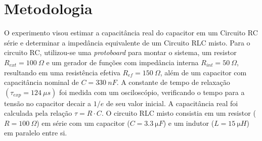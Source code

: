 \section{Metodologia}

O experimento visou estimar a capacitância real do capacitor em um Circuito RC série e determinar a impedância equivalente de um Circuito RLC misto. Para o circuito RC, utilizou-se uma \textit{protoboard} para montar o sistema, um resistor $R_{ext}=100~\Omega$ e um gerador de funções com impedância interna $R_{int}=50~\Omega$, resultando em uma resistência efetiva $R_{ef}=150~\Omega$, além de um capacitor com capacitância nominal de \(C = \qty{330}{nF} \). A constante de tempo de relaxação $(\tau_{exp}=124~\mu s)$ foi medida com um osciloscópio, verificando o tempo para a tensão no capacitor decair a $1/e$ de seu valor inicial. A capacitância real foi calculada pela relação $\tau=R\cdot C$. O circuito RLC misto consistia em um resistor (\(R = \qty{100}{\Omega} \)) em série com um capacitor (\(C = \qty{3.3}{\micro F}\)) e um indutor (\(L = \qty{15}{\micro H} \)) em paralelo entre si.

